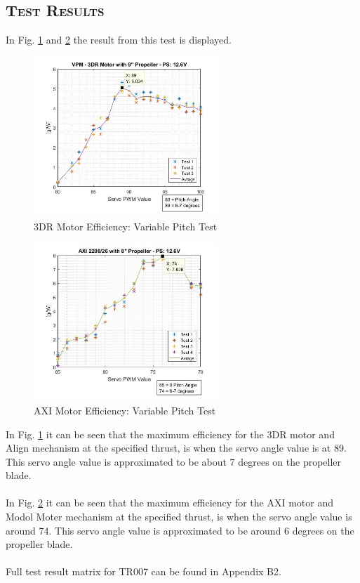 \subsection*{\textsc{\medium Test Results}}
In Fig. \ref{fig:vpm1} and \ref{fig:vpm2} the result from this test is displayed. 
\begin{figure}[H]
    \centering
    \includegraphics[width = 0.62\textwidth]{VAPIQ-PICTURES/3DRxx}
    \caption{3DR Motor Efficiency: Variable Pitch Test}
    \label{fig:vpm1}
\end{figure}
\begin{figure}[H]
    \centering
    \includegraphics[width = 0.62\textwidth]{VAPIQ-PICTURES/Axi2}
    \caption{AXI Motor Efficiency: Variable Pitch Test}
    \label{fig:vpm2}
\end{figure}

In Fig. \ref{fig:vpm1} it can be seen that the maximum efficiency for the 3DR motor and Align mechanism at the specified thrust, is when the servo angle value is at 89. This servo angle value is approximated to be about 7 degrees on the propeller blade. \\
\\
In Fig. \ref{fig:vpm2} it can be seen that the maximum efficiency for the AXI motor and Modol Moter mechanism at the specified thrust, is when the servo angle value is around 74. This servo angle value is approximated to be around 6 degrees on the propeller blade.\\
\\
Full test result matrix for TR007 can be found in Appendix B2.
\newpage

